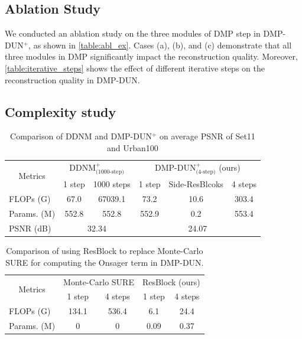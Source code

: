 \documentclass[10pt,twocolumn,letterpaper]{article}
\begin{document}
\subsection{Ablation Study}
We conducted an ablation study on the three modules of DMP step in DMP-DUN$^+$, as shown in \cref{table:abl_ex}. Cases (a), (b), and (c) demonstrate that all three modules in DMP significantly impact the reconstruction quality. Moreover, \cref{table:iterative_steps} shows the effect of different iterative steps on the reconstruction quality in DMP-DUN.

\subsection{Complexity study}

\begin{table}[t]
	\begin{adjustbox}{width=\linewidth,center}
		\begin{tabular}{@{}lccccc@{}}
			\toprule
			\multicolumn{1}{c}{\multirow{2}{*}{Metrics}} & \multicolumn{2}{c}{DDNM$^+_\text{(1000-step)}$\cite{wang2022zero}} & \multicolumn{3}{c}{DMP-DUN$^+_\text{(4-step)}$ (ours)} \\ \cmidrule(l){2-3}\cmidrule(l){4-6}  
			\multicolumn{1}{c}{} & 1 step & 1000 steps & 1 step & Side-ResBlcoks & 4 steps \\ \midrule
			FLOPs (G) & 67.0 & 67039.1 & 73.2 & 10.6 & 303.4 \\
			Params. (M) & 552.8 & 552.8 & 552.9 & 0.2 & 553.4 \\ \midrule
			PSNR (dB) & \multicolumn{2}{c}{32.34} & \multicolumn{3}{c}{24.07} \\ \bottomrule
		\end{tabular}
	\end{adjustbox}
	\caption{Comparison of DDNM and DMP-DUN$^+$ on average PSNR of Set11 and Urban100}
	\label{table:complex_ex_1}
\end{table}

\begin{table}[t]
	\centering
	\begin{adjustbox}{width=0.85\linewidth,center}
		\begin{tabular}{@{}ccccc@{}}
			\toprule
			\multirow{2}{*}{Metrics} & \multicolumn{2}{c}{Monte-Carlo SURE\cite{DBLP:journals/tip/RamaniBU08}} & \multicolumn{2}{c}{ResBlock (ours)} \\ \cmidrule(l){2-3} \cmidrule(l){4-5} 
			& 1 step & 4 steps & 1 step & 4 steps \\ \midrule
			\multicolumn{1}{l}{FLOPs (G)} & 134.1 & 536.4 & 6.1 & 24.4 \\
			\multicolumn{1}{l}{Params. (M)} & 0 & 0 & 0.09 & 0.37 \\ \bottomrule
		\end{tabular}
	\end{adjustbox}
	\caption{Comparison of using ResBlock to replace Monte-Carlo SURE for computing the Onsager term in DMP-DUN.}
	\label{table:complex_ex_2}
\end{table}
\end{document}

